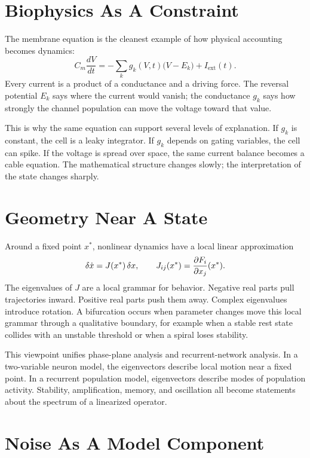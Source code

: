 \section*{Biophysics As A Constraint}

The membrane equation is the cleanest example of how physical accounting becomes dynamics:
\[
  C_m \frac{dV}{dt}
  =
  -\sum_k g_k(V,t)\bigl(V-E_k\bigr) + I_{\mathrm{ext}}(t).
\]
Every current is a product of a conductance and a driving force. The reversal potential \(E_k\) says where the current would vanish; the conductance \(g_k\) says how strongly the channel population can move the voltage toward that value.

This is why the same equation can support several levels of explanation. If \(g_k\) is constant, the cell is a leaky integrator. If \(g_k\) depends on gating variables, the cell can spike. If the voltage is spread over space, the same current balance becomes a cable equation. The mathematical structure changes slowly; the interpretation of the state changes sharply.

\section*{Geometry Near A State}

Around a fixed point \(x^\ast\), nonlinear dynamics have a local linear approximation
\[
  \delta \dot{x}
  =
  J(x^\ast)\,\delta x,
  \qquad
  J_{ij}(x^\ast)=\frac{\partial F_i}{\partial x_j}(x^\ast).
\]
The eigenvalues of \(J\) are a local grammar for behavior. Negative real parts pull trajectories inward. Positive real parts push them away. Complex eigenvalues introduce rotation. A bifurcation occurs when parameter changes move this local grammar through a qualitative boundary, for example when a stable rest state collides with an unstable threshold or when a spiral loses stability.

This viewpoint unifies phase-plane analysis and recurrent-network analysis. In a two-variable neuron model, the eigenvectors describe local motion near a fixed point. In a recurrent population model, eigenvectors describe modes of population activity. Stability, amplification, memory, and oscillation all become statements about the spectrum of a linearized operator.

\section*{Noise As A Model Component}

